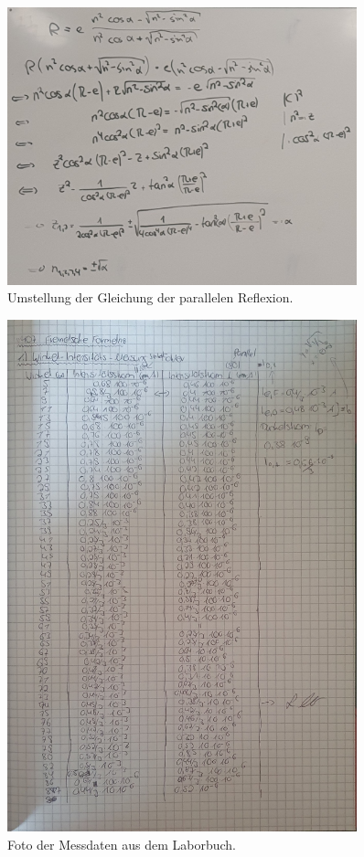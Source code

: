 \begin{figure}[H]
    \centering
    \includegraphics[width=0.9\textwidth]{content/Gleichung21.jpg}
    \caption{Umstellung der Gleichung der parallelen Reflexion.}
\end{figure}

\begin{figure}[H]
    \centering
    \includegraphics[width=0.9\textwidth]{content/Laborbuch.jpg}
    \caption{Foto der Messdaten aus dem Laborbuch.}
\end{figure}




%
